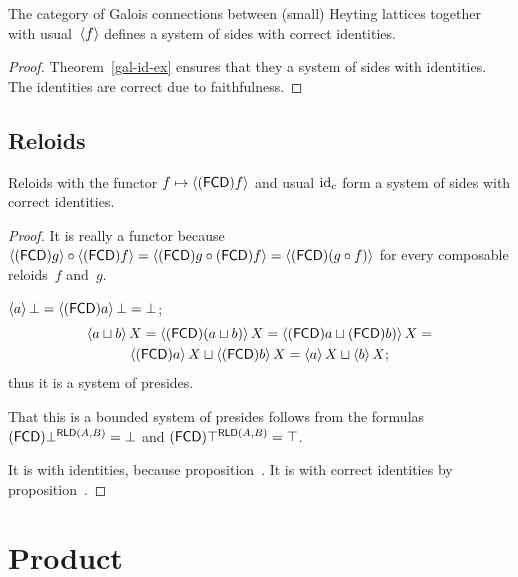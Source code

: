 \begin{prop}
The category of Galois connections between (small) Heyting lattices together with usual~$\left\langle f\right\rangle$
defines a system of sides with correct identities.
\end{prop}

\begin{proof}
Theorem~\ref{gal-id-ex} ensures that they a system of sides with identities. The identities are correct due to faithfulness.
\end{proof}

\subsection{Reloids}

\begin{prop}
Reloids with the functor $f\mapsto\left\langle (\mathsf{FCD}) f\right\rangle$ and usual $\operatorname{id}_c$ form a system of sides with correct identities.
\end{prop}

\begin{proof}
It is really a functor because
$\left\langle (\mathsf{FCD}) g\right\rangle\circ\left\langle (\mathsf{FCD}) f\right\rangle = \left\langle (\mathsf{FCD}) g\circ(\mathsf{FCD}) f\right\rangle = \left\langle (\mathsf{FCD})(g\circ f)\right\rangle$
for every composable reloids~$f$ and~$g$.

$\left\langle a\right\rangle\bot = \left\langle (\mathsf{FCD}) a\right\rangle\bot = \bot$;
\begin{multline*}
\left\langle a\sqcup b\right\rangle X = \left\langle (\mathsf{FCD})(a\sqcup b)\right\rangle X = \left\langle (\mathsf{FCD}) a\sqcup(\mathsf{FCD}) b)\right\rangle X = \\
\left\langle (\mathsf{FCD}) a\right\rangle X\sqcup\left\langle (\mathsf{FCD}) b\right\rangle X = \left\langle a\right\rangle X\sqcup\left\langle b\right\rangle X;
\end{multline*}
thus it is a system of presides.

That this is a bounded system of presides follows from the formulas
$(\mathsf{FCD})\bot^{\mathsf{RLD}(A,B)}=\bot$ and $(\mathsf{FCD})\top^{\mathsf{RLD}(A,B)}=\top$.

It is with identities, because proposition~.
It is with correct identities by proposition~.
\end{proof}



\section{Product}

